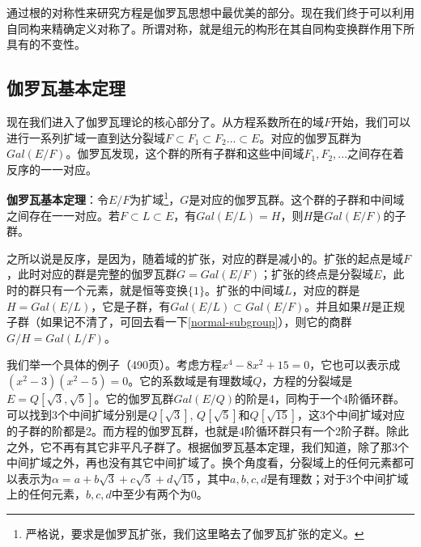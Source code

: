 \documentclass[b5paper]{ctexart}
\begin{document}
\begin{mdframed}
通过根的对称性来研究方程是伽罗瓦思想中最优美的部分。现在我们终于可以利用自同构来精确定义对称了。所谓对称，就是组元的构形在其自同构变换群作用下所具有的不变性。
\end{mdframed}

\begin{Exercise}
\end{Exercise}

\subsection{伽罗瓦基本定理}

现在我们进入了伽罗瓦理论的核心部分了。从方程系数所在的域$F$开始，我们可以进行一系列扩域一直到达分裂域$F \subset F_1 \subset F_2 ... \subset E$。对应的伽罗瓦群为$Gal(E/F)$。伽罗瓦发现，这个群的所有子群和这些中间域$F_1, F_2, ...$之间存在着反序的一一对应。

\begin{theorem}
\textbf{伽罗瓦基本定理}：令$E/F$为扩域\footnote{严格说，要求是伽罗瓦扩张，我们这里略去了伽罗瓦扩张的定义。}，$G$是对应的伽罗瓦群。这个群的子群和中间域之间存在一一对应。若$F \subset L \subset E$，有$Gal(E/L) = H$，则$H$是$Gal(E/F)$的子群。
\end{theorem}

之所以说是反序，是因为，随着域的扩张，对应的群是减小的。扩张的起点是域$F$，此时对应的群是完整的伽罗瓦群$G = Gal(E/F)$；扩张的终点是分裂域$E$，此时的群只有一个元素，就是恒等变换$\{1\}$。扩张的中间域$L$，对应的群是$H = Gal(E/L)$，它是子群，有$Gal(E/L) \subset Gal(E/F)$。并且如果$H$是正规子群（如果记不清了，可回去看一下\ref{normal-subgroup}），则它的商群$G/H = Gal(L/F)$。

我们举一个具体的例子\cite{MArtin}（490页）。考虑方程$x^4 - 8x^2 + 15 = 0$，它也可以表示成$(x^2 - 3)(x^2 - 5) = 0$。它的系数域是有理数域$Q$，方程的分裂域是$E = Q[\sqrt{3}, \sqrt{5}]$。它的伽罗瓦群$Gal(E/Q)$的阶是4，同构于一个4阶循环群。可以找到3个中间扩域分别是$Q[\sqrt{3}]$, $Q[\sqrt{5}]$和$Q[\sqrt{15}]$，这3个中间扩域对应的子群的阶都是2。而方程的伽罗瓦群，也就是4阶循环群只有一个2阶子群。除此之外，它不再有其它非平凡子群了。根据伽罗瓦基本定理，我们知道，除了那3个中间扩域之外，再也没有其它中间扩域了。换个角度看，分裂域上的任何元素都可以表示为$\alpha = a + b\sqrt{3} + c\sqrt{5} + d\sqrt{15}$，其中$a, b, c, d$是有理数；对于3个中间扩域上的任何元素，$b, c, d$中至少有两个为0。
\end{document}
